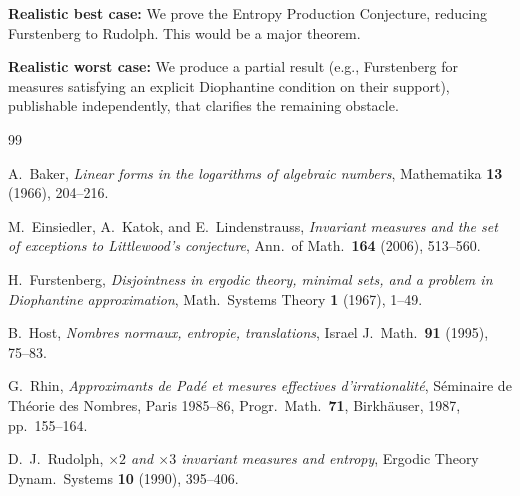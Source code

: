 \documentclass[11pt,a4paper]{article}
\begin{document}
\textbf{Realistic best case:}
We prove the Entropy Production Conjecture, reducing Furstenberg
to Rudolph.  This would be a major theorem.

\textbf{Realistic worst case:}
We produce a partial result (e.g., Furstenberg for measures
satisfying an explicit Diophantine condition on their support),
publishable independently, that clarifies the remaining obstacle.


\begin{thebibliography}{99}

A.~Baker, \emph{Linear forms in the logarithms of algebraic numbers},
Mathematika \textbf{13} (1966), 204--216.

M.~Einsiedler, A.~Katok, and E.~Lindenstrauss,
\emph{Invariant measures and the set of exceptions to Littlewood's conjecture},
Ann.\ of Math.\ \textbf{164} (2006), 513--560.

H.~Furstenberg, \emph{Disjointness in ergodic theory, minimal sets,
and a problem in Diophantine approximation},
Math.\ Systems Theory \textbf{1} (1967), 1--49.

B.~Host, \emph{Nombres normaux, entropie, translations},
Israel J.\ Math.\ \textbf{91} (1995), 75--83.

G.~Rhin, \emph{Approximants de Pad\'e et mesures effectives
d'irrationalit\'e},
S\'eminaire de Th\'eorie des Nombres, Paris 1985--86,
Progr.\ Math.\ \textbf{71}, Birkh\"auser, 1987, pp.~155--164.

D.~J.~Rudolph, \emph{$\times 2$ and $\times 3$ invariant measures
and entropy},
Ergodic Theory Dynam.\ Systems \textbf{10} (1990), 395--406.

\end{thebibliography}
\end{document}
